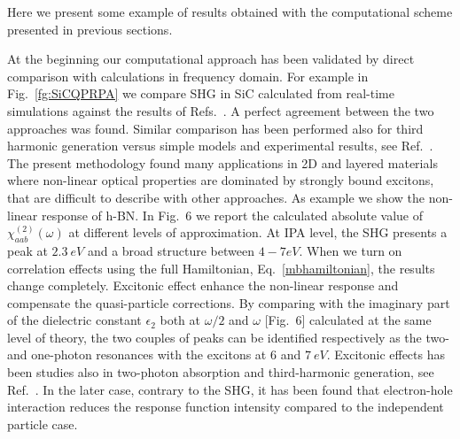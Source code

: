 %                                                                                                                     
Here we present some example of results obtained with the computational scheme presented in previous sections.

At the beginning our computational approach has been validated by direct comparison with calculations in frequency domain. For example in Fig.~\ref{fg:SiCQPRPA} we compare SHG in SiC calculated from real-time simulations against the results of Refs.~\cite{PhysRevB.82.235201,PSSB.427.1984}. A perfect agreement between the two approaches was found. Similar comparison has been performed also for third harmonic generation versus simple models and experimental results, see Ref.~.\\
The present methodology found many applications in 2D and layered materials\cite{attaccalite2015strong,wei2019second,beach2020strain,mishra2020exciton,attaccalite2019second} where non-linear optical properties are dominated by strongly bound excitons, that are difficult to describe with other approaches. As example we show the non-linear response of h-BN. In Fig.~6
we report the calculated absolute value of $\chi^{(2)}_{aab} (\omega)$ at different levels of approximation. 
At IPA level, the SHG presents a peak at $2.3~eV$ and a broad structure between $4 - 7 eV$. When we turn on correlation effects using the full Hamiltonian, Eq.~\eqref{mbhamiltonian}, the results change completely.
Excitonic effect enhance the non-linear response and compensate the quasi-particle corrections. By comparing with the imaginary part of the dielectric constant $\epsilon_2$ both at $\omega/2$ and  $\omega$ [Fig.~6] calculated at the same level of theory, the two couples of peaks can be identified respectively as the two- and one-photon resonances with the excitons at $6$ and $7~eV$. 
Excitonic effects has been studies also in two-photon absorption and third-harmonic generation, see Ref.~. In the later case, contrary to the SHG, it has been found that electron-hole interaction reduces the response function intensity compared to the independent particle case.\\ 
